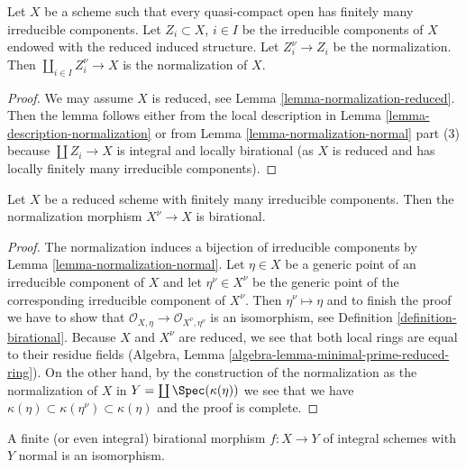 \begin{lemma}
\label{lemma-normalization-in-terms-of-components}
Let $X$ be a scheme such that every quasi-compact open has
finitely many irreducible components. Let $Z_i \subset X$, $i \in I$
be the irreducible components of $X$ endowed with the reduced
induced structure. Let $Z_i^\nu \to Z_i$ be the normalization.
Then $\coprod_{i \in I} Z_i^\nu \to X$ is the normalization of $X$.
\end{lemma}

\begin{proof}
We may assume $X$ is reduced, see Lemma \ref{lemma-normalization-reduced}.
Then the lemma follows either from the local description in
Lemma \ref{lemma-description-normalization}
or from Lemma \ref{lemma-normalization-normal} part (3) because
$\coprod Z_i \to X$ is integral and locally birational (as $X$ is reduced
and has locally finitely many irreducible components).
\end{proof}

\begin{lemma}
\label{lemma-normalization-birational}
Let $X$ be a reduced scheme with finitely many irreducible components.
Then the normalization morphism $X^\nu \to X$ is birational.
\end{lemma}

\begin{proof}
The normalization induces a bijection of irreducible components by
Lemma \ref{lemma-normalization-normal}. Let $\eta \in X$ be a generic
point of an irreducible component of $X$ and let $\eta^\nu \in X^\nu$
be the generic point of the corresponding irreducible component of $X^\nu$.
Then $\eta^\nu \mapsto \eta$ and to finish the proof we have to show that
$\mathcal{O}_{X, \eta} \to \mathcal{O}_{X^\nu, \eta^\nu}$
is an isomorphism, see Definition \ref{definition-birational}.
Because $X$ and $X^\nu$ are reduced, we see that both local rings
are equal to their residue fields
(Algebra, Lemma \ref{algebra-lemma-minimal-prime-reduced-ring}).
On the other hand, by the construction of the normalization
as the normalization of $X$ in $Y = \coprod \Spec(\kappa(\eta))$
we see that we have
$\kappa(\eta) \subset \kappa(\eta^\nu) \subset \kappa(\eta)$
and the proof is complete.
\end{proof}

\begin{lemma}
\label{lemma-finite-birational-over-normal}
A finite (or even integral) birational morphism $f : X \to Y$
of integral schemes with $Y$ normal is an isomorphism.
\end{lemma}

